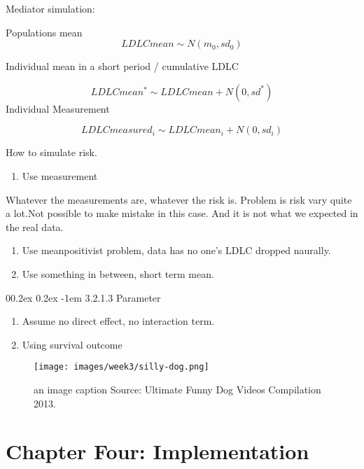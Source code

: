 \documentclass[
  english,
  man]{apa6}
\makeatletter
\providecommand{\tightlist}{%
  \setlength{\itemsep}{0pt}\setlength{\parskip}{0pt}}
\let\oldparagraph\paragraph
\renewcommand{\paragraph}[1]{\oldparagraph{#1}\mbox{}}
\renewcommand{\paragraph}{\@startsection{paragraph}{4}{\parindent}%
  {0\baselineskip \@plus 0.2ex \@minus 0.2ex}%
  {-1em}%
  {\normalfont\normalsize\bfseries\itshape\typesectitle}}
\makeatother
\begin{document}
Mediator simulation:

Populations mean
\[LDLCmean \sim N(m_0,sd_0) \]

Individual mean in a short period / cumulative LDLC

\[LDLCmean^* \sim LDLCmean + N(0,sd^*) \]
Individual Measurement

\[LDLCmeasured_i \sim LDLCmean_i + N(0,sd_i)\]

How to simulate risk.

\begin{enumerate}
\def\labelenumi{\arabic{enumi}.}
\tightlist
\item
  Use measurement\n
\end{enumerate}

Whatever the measurements are, whatever the risk is. Problem is risk vary quite a lot.Not possible to make mistake in this case. And it is not what we expected in the real data.

\begin{enumerate}
\def\labelenumi{\arabic{enumi}.}
\setcounter{enumi}{1}
\item
  Use mean\n positivist problem, data has no one's LDLC dropped naurally.
\item
  Use something in between, short term mean.\n
\end{enumerate}

\hypertarget{parameter}{%
\paragraph{3.2.1.3 Parameter}\label{parameter}}

\begin{enumerate}
\def\labelenumi{\arabic{enumi}.}
\tightlist
\item
  Assume no direct effect, no interaction term.\n
\item
  Using survival outcome\n
\end{enumerate}

\begin{figure}
\centering
\texttt{[image: images/week3/silly-dog.png]}
\caption{an image caption Source: Ultimate Funny Dog Videos Compilation 2013.}
\end{figure}

\hypertarget{chapter-four-implementation}{%
\section{Chapter Four: Implementation}\label{chapter-four-implementation}}
\end{document}
